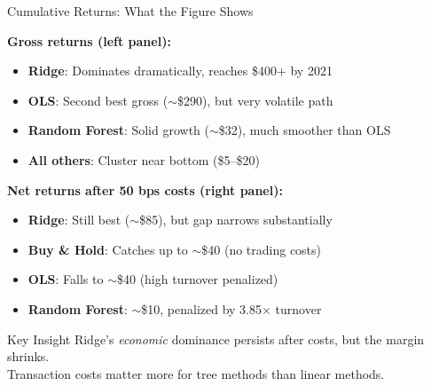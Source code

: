\documentclass[10pt]{beamer}
\newcommand{\highlightgreen}[1]{\textcolor{AccentGreen}{\textbf{#1}}}
\begin{document}

\begin{frame}{Cumulative Returns: What the Figure Shows}

  \textbf{Gross returns (left panel):}
  \begin{itemize}
    \item \highlightgreen{Ridge}: Dominates dramatically, reaches \$400+ by 2021
    \item \textbf{OLS}: Second best gross ($\sim$\$290), but very volatile path
    \item \textbf{Random Forest}: Solid growth ($\sim$\$32), much smoother than OLS
    \item \textbf{All others}: Cluster near bottom (\$5--\$20)
  \end{itemize}

  \vspace{0.5em}
  \textbf{Net returns after 50 bps costs (right panel):}
  \begin{itemize}
    \item \highlightgreen{Ridge}: Still best ($\sim$\$85), but gap narrows substantially
    \item \textbf{Buy \& Hold}: Catches up to $\sim$\$40 (no trading costs)
    \item \textbf{OLS}: Falls to $\sim$\$40 (high turnover penalized)
    \item \textbf{Random Forest}: $\sim$\$10, penalized by 3.85$\times$ turnover
  \end{itemize}

  \vspace{0.5em}
  \begin{block}{Key Insight}
    Ridge's \textit{economic} dominance persists after costs, but the margin shrinks.\\
    Transaction costs matter more for tree methods than linear methods.
  \end{block}
\end{frame}

\end{document}
